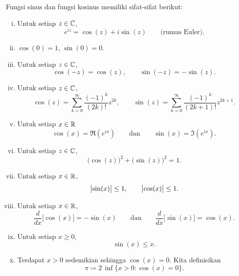 \begin{prop}
Fungsi sinus dan fungsi kosinus memiliki sifat-sifat berikut:
\begin{enumerate}[(i)]
\item Untuk setiap $z \in {\mathbb{C}}$,
\begin{equation*}
e^{iz} = \cos(z) + i\sin(z) \qquad
\text{(rumus Euler)}.
\end{equation*}
\item $\cos(0) = 1$, $\sin(0) = 0$.
\item Untuk setiap $z \in {\mathbb{C}}$,
\begin{equation*}
\cos(-z) = \cos(z), \qquad
\sin(-z) = -\sin(z).
\end{equation*}
\item Untuk setiap $z \in {\mathbb{C}}$,
\begin{equation*}
\cos(z) = \sum_{k=0}^\infty \frac{{(-1)}^k}{(2k)!} z^{2k} ,
\qquad
\sin(z) = \sum_{k=0}^\infty \frac{{(-1)}^k}{(2k+1)!} z^{2k+1} .
\end{equation*}
\item Untuk setiap $x \in {\mathbb{R}}$
\begin{equation*}
\cos(x) = \Re (e^{ix})
\qquad\text{dan}\qquad
\sin(x) = \Im (e^{ix}) .
\end{equation*}
\item Untuk setiap $z \in {\mathbb{C}}$,
\begin{equation*}
{\bigl( \cos(z) \bigr)}^2 + {\bigl( \sin(z) \bigr)}^2 = 1 .
\end{equation*}
\item Untuk setiap $x \in {\mathbb{R}}$,
\begin{equation*}
\bigl\lvert {\sin(x)} \bigr\rvert \leq 1, \qquad \bigl\lvert {\cos(x)} \bigr\rvert \leq 1 .
\end{equation*}
\item Untuk setiap $x \in {\mathbb{R}}$,
\begin{equation*}
\frac{d}{dx} \bigl[ \cos(x) \bigr] = -\sin(x)
\qquad \text{dan} \qquad
\frac{d}{dx} \bigl[ \sin(x) \bigr] = \cos(x) .
\end{equation*}
\item Untuk setiap $x \geq 0$,
\begin{equation*}
\sin(x) \leq x .
\end{equation*}
\item
Terdapat $x > 0$ sedemikian sehingga $\cos(x) = 0$. Kita definisikan
\begin{equation*}
\pi \coloneqq 2 \, \inf \{ x > 0 : \cos(x) = 0 \} .
\end{equation*}

\end{enumerate}
\end{prop}

